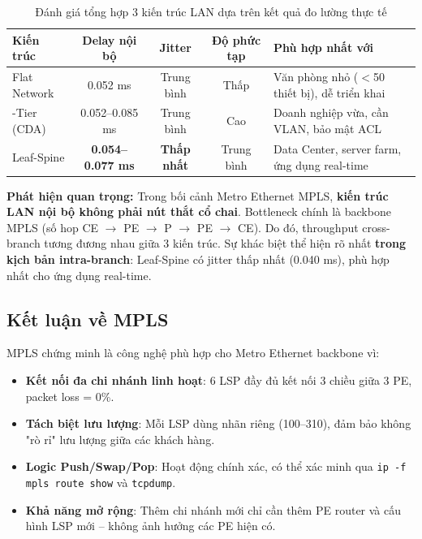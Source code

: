 \begin{table}[H]
    \centering
    \caption{Đánh giá tổng hợp 3 kiến trúc LAN dựa trên kết quả đo lường thực tế}
    \vspace{0.2cm}
    \small
    \begin{tabularx}{\textwidth}{|>{\raggedright\arraybackslash}p{2.2cm}|c|c|c|>{\raggedright\arraybackslash}X|}
        \hline
        \textbf{Kiến trúc} & \textbf{Delay nội bộ} & \textbf{Jitter} & \textbf{Độ phức tạp} & \textbf{Phù hợp nhất với} \\ \hline
        Flat Network & 0.052 ms & Trung bình & Thấp & Văn phòng nhỏ ($<$50 thiết bị), dễ triển khai \\ \hline
        3-Tier (CDA) & 0.052--0.085 ms & Trung bình & Cao & Doanh nghiệp vừa, cần VLAN, bảo mật ACL \\ \hline
        Leaf-Spine & \textbf{0.054--0.077 ms} & \textbf{Thấp nhất} & Trung bình & Data Center, server farm, ứng dụng real-time \\ \hline
    \end{tabularx}
    \label{tab:arch_summary}
\end{table}

\textbf{Phát hiện quan trọng:} Trong bối cảnh Metro Ethernet MPLS, \textbf{kiến trúc LAN nội bộ không phải nút thắt cổ chai}. Bottleneck chính là backbone MPLS (số hop CE $\to$ PE $\to$ P $\to$ PE $\to$ CE). Do đó, throughput cross-branch tương đương nhau giữa 3 kiến trúc. Sự khác biệt thể hiện rõ nhất \textbf{trong kịch bản intra-branch}: Leaf-Spine có jitter thấp nhất (0.040 ms), phù hợp nhất cho ứng dụng real-time.

\subsection{Kết luận về MPLS}

MPLS chứng minh là công nghệ phù hợp cho Metro Ethernet backbone vì:
\begin{itemize}
    \item \textbf{Kết nối đa chi nhánh linh hoạt}: 6 LSP đầy đủ kết nối 3 chiều giữa 3 PE, packet loss = 0\%.
    \item \textbf{Tách biệt lưu lượng}: Mỗi LSP dùng nhãn riêng (100--310), đảm bảo không "rò rỉ" lưu lượng giữa các khách hàng.
    \item \textbf{Logic Push/Swap/Pop}: Hoạt động chính xác, có thể xác minh qua \texttt{ip -f mpls route show} và \texttt{tcpdump}.
    \item \textbf{Khả năng mở rộng}: Thêm chi nhánh mới chỉ cần thêm PE router và cấu hình LSP mới -- không ảnh hưởng các PE hiện có.
\end{itemize}

